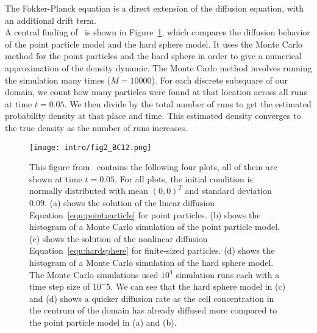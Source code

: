 The Fokker-Planck equation is a direct extension of the diffusion equation, with an additional drift term.\\
A central finding of~\cite{Bruna2012} is shown in Figure~\ref{fig:fig2BC12}, which compares the diffusion behavior of the point particle model and the hard sphere model. 
It uses the Monte Carlo method for the point particles and the hard sphere in order to give a numerical approximation of the density dynamic. 
The Monte Carlo method involves running the simulation many times ($M=10000$). 
For each discrete subsquare of our domain, we count how many particles were found at that location across all runs at time $t=0.05$. 
We then divide by the total number of runs to get the estimated probability density at that place and time. 
This estimated density converges to the true density as the number of runs increases. \\

\begin{figure}[h!]
	\centering
    \texttt{[image: intro/fig2\_BC12.png]}
    \caption{
    This figure from~\cite{Bruna2012} contains the following four plots, all of them are shown at time \( t=0.05 \). 
	For all plots, the initial condition is normally distributed with mean $(0,0)^T$ and standard deviation $0.09$. 
    (a) shows the solution of the linear diffusion Equation~\eqref{equ:pointparticle} for point particles. 
    (b) shows the histogram of a Monte Carlo simulation of the point particle model. 
    (c) shows the solution of the nonlinear diffusion Equation~\eqref{equ:hardsphere} for finite-sized particles. 
    (d) shows the histogram of a Monte Carlo simulation of the hard sphere model. 
    The Monte Carlo simulations used $10^4$ simulation runs each with a time step size of $10^-5$.
	We can see that the hard sphere model in (c) and (d) shows a quicker diffusion rate as the cell concentration in the centrum of the domain has already diffused more compared to the point particle model in (a) and (b). 
    }
    \label{fig:fig2BC12}
\end{figure}



